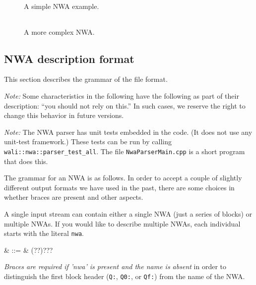 \begin{figure}
  \centering
  \begin{tabular}{|p{1.75in}|}
    
  \end{tabular}
  \caption{A simple NWA example. }
  \label{Fi:nwa-simple}
\end{figure}

\begin{figure}
  \centering
  \begin{tabular}{|p{5.5in}|}
    
  \end{tabular}
  \caption {A more complex NWA. }
  \label{Fi:nwa-mattf}
\end{figure}

\subsection{NWA description format}
\label{Se:nwa-grammar}

This section describes the grammar of the file format.

\textsl{Note:} Some characteristics in the following have the
following as part of their description: ``you should not rely on
this.'' In such cases, we reserve the right to change this behavior in
future versions. %

\textsl{Note:} The NWA parser has unit tests embedded in the code. (It
does not use any unit-test framework.) These tests can be run by
calling \texttt{wali::nwa::parser\_test\_all}. The file
\texttt{NwaParserMain.cpp} is a short program that does this.


The grammar for an NWA is as follows. In order to accept a couple of
slightly different output formats we have used in the past, there are
some choices in whether braces are present and other aspects.


A single input stream can contain either a single NWA (just a series
of blocks) or multiple NWAs. If you would like to describe multiple
NWAs, each individual starts with the literal \texttt{nwa}.


\begin{grammar}
   & ::= & \left(\cfgsp{}?\cfgsp\term{:}?\right)?\cfgsp\term{\{}?\cfgsp{}\cfgsp\term{\}}?
\end{grammar}

\textsl{Braces are required if 'nwa' is present and the name is absent}
 in order to
 distinguish the first block header (\texttt{Q:}, \texttt{Q0:},
 or \texttt{Qf:}) from the name of the NWA.

